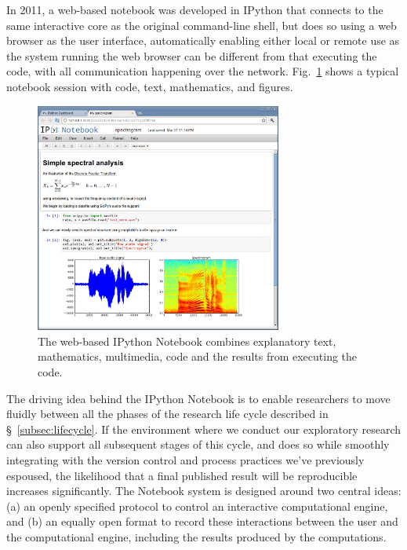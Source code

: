 \documentclass[ChapterTOCs,krantz2]{krantz} %
\begin{document}
In 2011, a web-based notebook was developed in IPython that connects to the
same interactive core as the original command-line shell, but does so using a
web browser as the user interface, automatically enabling either local or
remote use as the system running the web browser can be different from that
executing the code, with all communication happening over the network.
Fig.~\ref{fig:IPython-notebook} shows a typical notebook session with code,
text, mathematics, and figures.

\begin{figure}
  \begin{centering}
    \includegraphics[width=3.2in]{fig/ipython-notebook-specgram.png}\par
  \end{centering}

  \caption{\label{fig:IPython-notebook}The web-based IPython Notebook combines
    explanatory text, mathematics, multimedia, code and the results from
    executing the code.}
\end{figure}

The driving idea behind the IPython Notebook is to enable researchers to move
fluidly between all the phases of the research life cycle described in
§~\ref{subsec:lifecycle}.  If the environment where we conduct our
exploratory research can also support all subsequent stages of this cycle, and
does so while smoothly integrating with the version control and process
practices we've previously espoused, the likelihood that a final published
result will be reproducible increases significantly.  The Notebook system is
designed around two central ideas: (a) an openly specified protocol to control
an interactive computational engine, and (b) an equally open format to record
these interactions between the user and the computational engine, including the
results produced by the computations.
\end{document}
